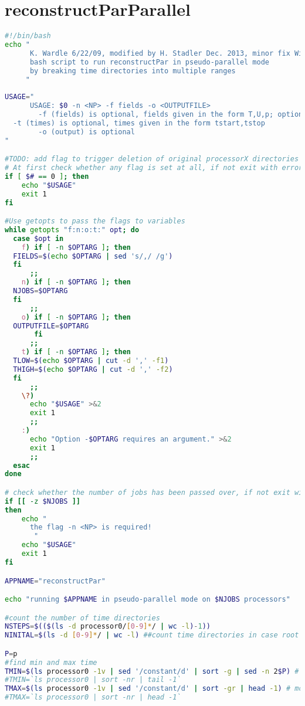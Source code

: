 \section{reconstructParParallel}
\begin{lstlisting}[language=bash]
#!/bin/bash
echo "
      K. Wardle 6/22/09, modified by H. Stadler Dec. 2013, minor fix Will Bateman Sep 2014.
      bash script to run reconstructPar in pseudo-parallel mode
      by breaking time directories into multiple ranges
     "
     
USAGE="
      USAGE: $0 -n <NP> -f fields -o <OUTPUTFILE>
        -f (fields) is optional, fields given in the form T,U,p; option is passed on to reconstructPar
  -t (times) is optional, times given in the form tstart,tstop
        -o (output) is optional 
"

#TODO: add flag to trigger deletion of original processorX directories after successful reconstruction
# At first check whether any flag is set at all, if not exit with error message
if [ $# == 0 ]; then
    echo "$USAGE"
    exit 1
fi

#Use getopts to pass the flags to variables
while getopts "f:n:o:t:" opt; do
  case $opt in
    f) if [ -n $OPTARG ]; then
  FIELDS=$(echo $OPTARG | sed 's/,/ /g')
  fi
      ;;
    n) if [ -n $OPTARG ]; then
  NJOBS=$OPTARG
  fi
      ;;
    o) if [ -n $OPTARG ]; then
  OUTPUTFILE=$OPTARG
       fi
      ;;
    t) if [ -n $OPTARG ]; then
  TLOW=$(echo $OPTARG | cut -d ',' -f1)
  THIGH=$(echo $OPTARG | cut -d ',' -f2)
  fi
      ;;
    \?)
      echo "$USAGE" >&2
      exit 1
      ;;
    :)
      echo "Option -$OPTARG requires an argument." >&2
      exit 1
      ;;
  esac
done

# check whether the number of jobs has been passed over, if not exit with error message
if [[ -z $NJOBS ]]
then
    echo "
      the flag -n <NP> is required!
       "
    echo "$USAGE"
    exit 1
fi

APPNAME="reconstructPar"

echo "running $APPNAME in pseudo-parallel mode on $NJOBS processors"

#count the number of time directories
NSTEPS=$(($(ls -d processor0/[0-9]*/ | wc -l)-1))
NINITAL=$(ls -d [0-9]*/ | wc -l) ##count time directories in case root dir, this will include 0

P=p
#find min and max time
TMIN=$(ls processor0 -1v | sed '/constant/d' | sort -g | sed -n 2$P) # modified to omit constant and first time directory
#TMIN=`ls processor0 | sort -nr | tail -1`
TMAX=$(ls processor0 -1v | sed '/constant/d' | sort -gr | head -1) # modified to omit constant directory
#TMAX=`ls processor0 | sort -nr | head -1`


\end{lstlisting}
